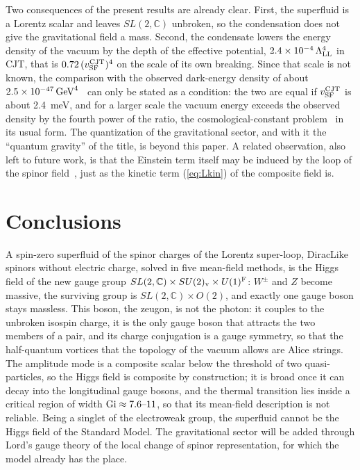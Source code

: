 \documentclass[aps,prd,twocolumn,superscriptaddress,nofootinbib,floatfix,longbibliography]{revtex4-2}
\newcommand{\LL}{{\rm LL}}
\newcommand{\SF}{{\rm SF}}
\begin{document}
Two consequences of the present results are already clear. First, the superfluid is a Lorentz scalar and leaves
$SL(2,\mathbb C)$ unbroken, so the condensation does not give the gravitational field a mass. Second, the condensate lowers
the energy density of the vacuum by the depth of the effective potential, $2.4\times10^{-4}\,\Lambda_\LL^4$ in CJT, that is
$0.72\,(v^{\rm CJT}_\SF)^4$ on the scale of its own breaking. Since that scale is not known, the comparison with the
observed dark-energy density of about $2.5\times10^{-47}\,{\rm GeV}^4$~\cite{PDG2024} can only be stated as a condition: the two
are equal if $v^{\rm CJT}_\SF$ is about 2.4~meV, and for a larger scale the vacuum energy exceeds the observed density by
the fourth power of the ratio, the cosmological-constant problem~\cite{Weinberg1989} in its usual form. The quantization of
the gravitational sector, and with it the ``quantum gravity'' of the title, is beyond this paper.
A related observation, also left to future work, is that the Einstein term itself may be induced by the loop of the spinor
field~\cite{Sakharov1967,Visser2002}, just as the kinetic term (\ref{eq:Lkin}) of the composite field is.

\section{Conclusions}
\label{sec:conclusions}

A spin-zero superfluid of the spinor charges of the Lorentz super-loop, DiracLike spinors without electric charge, solved
in five mean-field methods, is the Higgs field of the new gauge group $SL(2,\mathbb C)\times SU(2)_{\rm v}\times U(1)^{\rm F}$:
$W^\pm$ and $Z$ become massive, the surviving group is $SL(2,\mathbb C)\times O(2)$, and exactly one gauge boson stays
massless. This boson, the zeugon, is not the photon: it couples to the unbroken isospin charge, it is the only gauge boson
that attracts the two members of a pair, and its charge conjugation is a gauge symmetry, so that the half-quantum vortices
that the topology of the vacuum allows are Alice strings. The amplitude mode is a composite scalar below the threshold of two quasi-particles,
so the Higgs field is composite by construction; it is broad once it can decay into the longitudinal gauge bosons, and
the thermal transition lies inside a critical region of width ${\rm Gi}\approx7.6\mbox{--}11$, so that its mean-field
description is not reliable. Being a singlet of the electroweak group, the superfluid cannot be the Higgs field of the
Standard Model. The gravitational sector will be added through Lord's gauge theory of the local change of spinor
representation, for which the model already has the place.
\end{document}
